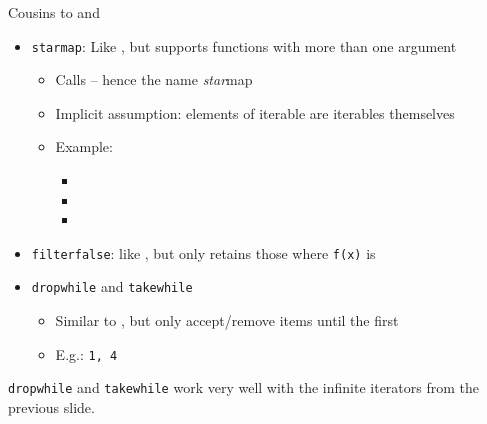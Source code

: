 
\begin{frame}[fragile]{Cousins to  and }
%
\begin{itemize}
\item \texttt{starmap}: Like , but supports functions with more than one argument
	\begin{itemize}
	\item Calls  -- hence the name \emph{star}map
	\item Implicit assumption: elements of iterable are iterables themselves
	\item Example:
		\begin{itemize}
		\item {}
		\item {}
		\item {}
		\end{itemize}
	\end{itemize}
\item \texttt{filterfalse}: like , but only retains those where \texttt{f(x)} is 
\item \texttt{dropwhile} and \texttt{takewhile}
	\begin{itemize}
	\item Similar to , but only accept/remove items until the first 
	\item E.\;g.:  \thus \texttt{1, 4}
	\end{itemize}
\end{itemize}
%
\begin{hintbox}
\footnotesize
\texttt{dropwhile} and \texttt{takewhile} work very well with the infinite iterators from the previous slide.
\end{hintbox}
%
\end{frame}


